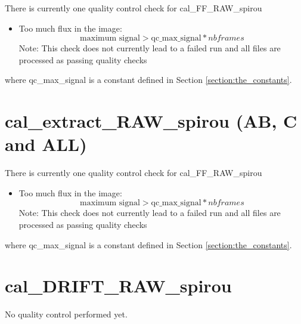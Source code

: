
There is currently one quality control check for cal\_FF\_RAW\_spirou
\begin{itemize}
\item Too much flux in the image: 
	\begin{equation}
	\text{maximum signal} > \text{qc\_max\_signal} * nbframes
	\end{equation}
	\noindent Note: This check does not currently lead to a failed run and all files are processed as passing quality checks
\end{itemize}

\noindent where qc\_max\_signal is a constant defined in Section \ref{section:the_constants}.


\section{cal\_extract\_RAW\_spirou (AB, C and ALL)}
\label{section:qc_cal_extract_RAW_spirou}

There is currently one quality control check for cal\_FF\_RAW\_spirou
\begin{itemize}
\item Too much flux in the image: 
	\begin{equation}
	\text{maximum signal} > \text{qc\_max\_signal} * nbframes
	\end{equation}
	\noindent Note: This check does not currently lead to a failed run and all files are processed as passing quality checks
\end{itemize}

\noindent where qc\_max\_signal is a constant defined in Section \ref{section:the_constants}.



\section{cal\_DRIFT\_RAW\_spirou}
\label{section:qc_cal_DRIFT_RAW_spirou}


No quality control performed yet.



